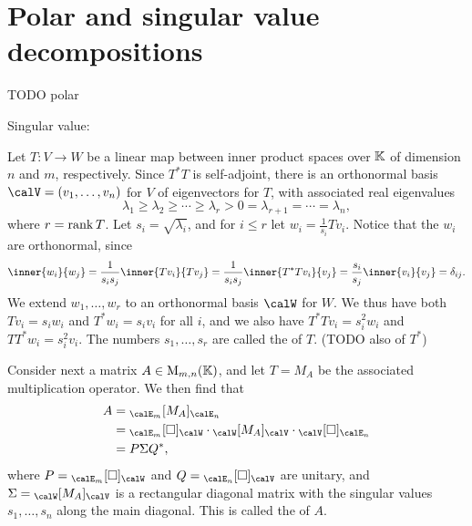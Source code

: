 \section{Polar and singular value decompositions}

TODO polar

Singular value:

Let $T \colon V \to W$ be a linear map between inner product spaces over $\mathbb{K}$ of dimension $n$ and $m$, respectively. Since $T^*T$ is self-adjoint, there is an orthonormal basis $\calV = (v_1,\ldots,v_n)$ for $V$ of eigenvectors for $T$, with associated real eigenvalues
%
\begin{equation*}
    \lambda_1
        \geq \lambda_2
        \geq \cdots
        \geq \lambda_r
        > 0
        = \lambda_{r+1}
        = \cdots
        = \lambda_n,
\end{equation*}
%
where $r = \operatorname{rank} T$. Let $s_i = \sqrt{\lambda_i}$, and for $i \leq r$ let $w_i = \tfrac{1}{s_i}Tv_i$. Notice that the $w_i$ are orthonormal, since
%
\begin{equation*}
    \inner{w_i}{w_j}
        = \frac{1}{s_i s_j} \inner{Tv_i}{Tv_j}
        = \frac{1}{s_i s_j} \inner{T^*Tv_i}{v_j}
        = \frac{s_i}{s_j} \inner{v_i}{v_j}
        = \delta_{ij}.
\end{equation*}
%
We extend $w_1,\ldots,w_r$ to an orthonormal basis $\calW$ for $W$. We thus have both $Tv_i = s_i w_i$ and $T^*w_i = s_i v_i$ for all $i$, and we also have $T^*Tv_i = s_i^2 w_i$ and $TT^*w_i = s_i^2 v_i$. The numbers $s_1, \ldots, s_r$ are called the  of $T$. (TODO also of $T^*$)

Consider next a matrix $A \in \mathrm{M}_{m,n}(\mathbb{K})$, and let $T = M_A$ be the associated multiplication operator. We then find that
%
\begin{align*}
    A
        &= \mr{\calE_m}{M_A}{\calE_n} \\
        &= \basischangemat{\calE_m}{\calW} \cdot \mr{\calW}{M_A}{\calV} \cdot \basischangemat{\calV}{\calE_n} \\
        &= P \Sigma Q^*,
\end{align*}
%
where $P = \basischangemat{\calE_m}{\calW}$ and $Q = \basischangemat{\calE_n}{\calV}$ are unitary, and $\Sigma = \mr{\calW}{M_A}{\calV}$ is a rectangular diagonal matrix with the singular values $s_1, \ldots, s_n$ along the main diagonal. This is called the  of $A$.